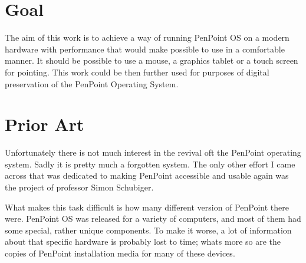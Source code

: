 \clearpage %

\section{Goal}

The aim of this work is to achieve a way of running PenPoint OS on a modern
hardware with performance that would make possible to use in a comfortable
manner.  It should be possible to use a mouse, a graphics tablet or a touch
screen for pointing.  This work could be then further used for purposes of
digital preservation of the PenPoint Operating System.


\clearpage

\section{Prior Art}



Unfortunately there is not much interest in the revival oft the PenPoint
operating system.  Sadly it is pretty much a forgotten system.  The only other
effort I came across that was dedicated to making PenPoint accessible and
usable again was the project of professor Simon Schubiger.

What makes this task difficult is how many different version of PenPoint there
were.  PenPoint OS was released for a variety of computers, and most of them
had some special, rather unique components.  To make it worse, a lot of
information about that specific hardware is probably lost to time; whats more
so are the copies of PenPoint installation media for many of these devices.

